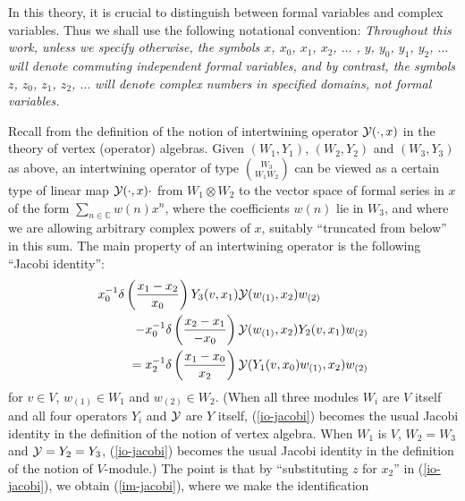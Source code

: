 \documentclass[12pt]{article}
\begin{document}
\begin{rema}\label{formalandcomplexvariables}
{\rm In this theory, it is crucial to distinguish between formal
variables and complex variables. Thus we shall use the following
notational convention: {\it Throughout this work, unless we specify
otherwise, the symbols $x$, $x_0$, $x_1$, $x_2$, $\dots$ , $y$, $y_0$,
$y_1$, $y_2$, $\dots$ will denote commuting independent formal
variables, and by contrast, the symbols $z$, $z_0$, $z_1$, $z_2$,
$\dots$ will denote complex numbers in specified domains, not formal
variables.}}
\end{rema}

\begin{rema}\label{im-io}{\rm
Recall {}from \cite{FHL} the definition of the notion of intertwining
operator ${\cal Y}(\cdot, x)$ in the theory of vertex (operator)
algebras.  Given $(W_1,Y_1)$, $(W_2,Y_2)$ and $(W_3,Y_3)$ as above, an
intertwining operator of type ${W_3 \choose {W_1 W_2}}$ can be viewed
as a certain type of linear map ${\cal Y}(\cdot,x)\cdot$ {}from $W_1
\otimes W_2$ to the vector space of formal series in $x$ of the form
$\sum_{n \in {\mathbb C}} w(n) x^n$, where the coefficients $w(n)$ lie in
$W_3$, and where we are allowing arbitrary complex powers of $x$,
suitably ``truncated {}from below'' in this sum.  The main property of an
intertwining operator is the following ``Jacobi identity'':
\begin{eqnarray}\label{io-jacobi}
\lefteqn{\dps x^{-1}_0\delta \left( {x_1-x_2\over x_0}\right)
Y_3(v,x_1){\cal Y}(w_{(1)},x_2)w_{(2)}}\nno\\
&&\hspace{2em}- x^{-1}_0\delta \left( {x_2-x_1\over -x_0}\right)
{\cal Y}(w_{(1)},x_2)Y_2(v,x_1)w_{(2)}\nno \\
&&{\dps = x^{-1}_2\delta \left( {x_1-x_0\over x_2}\right)
{\cal Y}(Y_1(v,x_0)w_{(1)},x_2)
w_{(2)}}
\end{eqnarray}
for $v\in V$, $w_{(1)}\in W_1$ and $w_{(2)}\in W_2$.  (When all three
modules $W_i$ are $V$ itself and all four operators $Y_i$ and ${\cal
Y}$ are $Y$ itself, (\ref{io-jacobi}) becomes the usual Jacobi
identity in the definition of the notion of vertex algebra.  When
$W_1$ is $V$, $W_2=W_3$ and ${\cal Y}=Y_2=Y_3$, (\ref{io-jacobi})
becomes the usual Jacobi identity in the definition of the notion of
$V$-module.)  The point is that by ``substituting $z$ for $x_2$'' in
(\ref{io-jacobi}), we obtain (\ref{im-jacobi}), where we make the
identification
\begin{eqnarray}\label{intwmap=intwopatz}

\end{eqnarray}}
\end{rema}
\end{document}
